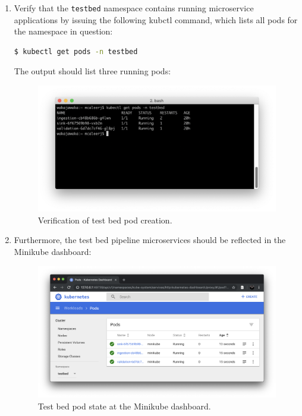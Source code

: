 \begin{enumerate}
 \item Verify that the \texttt{testbed} namespace contains running microservice applications by issuing the following kubctl command, which lists all pods for the namespace in question:

\begin{lstlisting}[language=bash]
$ kubectl get pods -n testbed
\end{lstlisting}

The output should list three running pods:

\begin{figure}[H]
	\centering  
	\includegraphics[width=\linewidth]{figures/appendixA/testbed-pods.png}
	\caption{Verification of test bed pod creation.}
\end{figure}

 \item Furthermore, the test bed pipeline microservices should be reflected in the Minikube dashboard:
 
 \begin{figure}[H]
 	\centering  
 	\includegraphics[width=\linewidth]{figures/appendixA/testbed-dashboard.png}
 	\caption{Test bed pod state at the Minikube dashboard.}
 \end{figure}


\end{enumerate}

